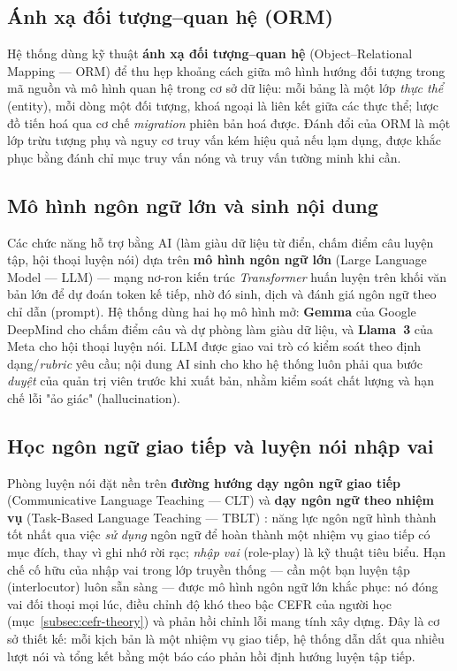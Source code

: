 \subsection{Ánh xạ đối tượng--quan hệ (ORM)}
\label{subsec:orm-theory}

Hệ thống dùng kỹ thuật \textbf{ánh xạ đối tượng--quan hệ} (Object--Relational
Mapping --- ORM) để thu hẹp khoảng cách giữa mô hình hướng đối tượng trong
mã nguồn và mô hình quan hệ trong cơ sở dữ liệu: mỗi bảng là một lớp
\textit{thực thể} (entity), mỗi dòng một đối tượng, khoá ngoại là liên kết
giữa các thực thể; lược đồ tiến hoá qua cơ chế \textit{migration} phiên bản
hoá được. Đánh đổi của ORM là một lớp trừu tượng phụ và nguy cơ truy vấn kém
hiệu quả nếu lạm dụng, được khắc phục bằng đánh chỉ mục truy vấn nóng và truy
vấn tường minh khi cần.

\subsection{Mô hình ngôn ngữ lớn và sinh nội dung}
\label{subsec:llm-theory}

Các chức năng hỗ trợ bằng AI (làm giàu dữ liệu từ điển, chấm điểm câu luyện
tập, hội thoại luyện nói) dựa trên \textbf{mô hình ngôn ngữ lớn} (Large
Language Model --- LLM) --- mạng nơ-ron kiến trúc \textit{Transformer}
\cite{vaswani2017attention} huấn luyện trên khối văn bản lớn để dự đoán token
kế tiếp, nhờ đó sinh, dịch và đánh giá ngôn ngữ theo chỉ dẫn (prompt). Hệ
thống dùng hai họ mô hình mở: \textbf{Gemma} của Google DeepMind
\cite{gemma2025technical} cho chấm điểm câu và dự phòng làm giàu dữ liệu, và
\textbf{Llama~3} của Meta \cite{grattafiori2024llama3} cho hội thoại luyện
nói. LLM được giao vai trò có kiểm soát theo định dạng/\textit{rubric} yêu
cầu; nội dung AI sinh cho kho hệ thống luôn phải qua bước \textit{duyệt} của
quản trị viên trước khi xuất bản, nhằm kiểm soát chất lượng và hạn chế lỗi
"ảo giác" (hallucination).

\subsection{Học ngôn ngữ giao tiếp và luyện nói nhập vai}
\label{subsec:clt-theory}

Phòng luyện nói đặt nền trên \textbf{đường hướng dạy ngôn ngữ giao tiếp}
(Communicative Language Teaching --- CLT) và \textbf{dạy ngôn ngữ theo nhiệm
vụ} (Task-Based Language Teaching --- TBLT)
\cite{richards2014approaches, ellis2003task}: năng lực ngôn ngữ hình thành
tốt nhất qua việc \textit{sử dụng} ngôn ngữ để hoàn thành một nhiệm vụ giao
tiếp có mục đích, thay vì ghi nhớ rời rạc; \textit{nhập vai} (role-play) là
kỹ thuật tiêu biểu. Hạn chế cố hữu của nhập vai trong lớp truyền thống ---
cần một bạn luyện tập (interlocutor) luôn sẵn sàng --- được mô hình ngôn ngữ
lớn khắc phục: nó đóng vai đối thoại mọi lúc, điều chỉnh độ khó theo bậc CEFR
của người học (mục~\ref{subsec:cefr-theory}) và phản hồi chỉnh lỗi mang tính
xây dựng. Đây là cơ sở thiết kế: mỗi kịch bản là một nhiệm vụ giao tiếp, hệ
thống dẫn dắt qua nhiều lượt nói và tổng kết bằng một báo cáo phản hồi định
hướng luyện tập tiếp.

